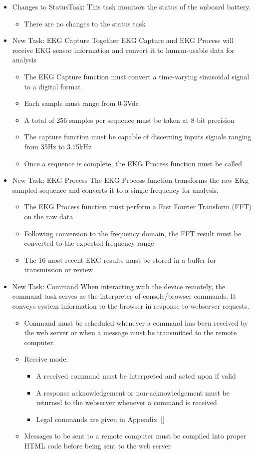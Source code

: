\documentclass[12pt]{article} %
\begin{document}
\begin{itemize}
  \item Changes to StatusTask:
		This task monitors the status of the onboard battery.
    \begin{itemize}
      \item There are no changes to the status task
    \end{itemize}
	\item New Task: EKG Capture
		Together EKG Capture and EKG Process will receive EKG sensor information
		and convert it to human-usable data for analysis
		\begin{itemize}
			\item The EKG Capture function must convert a time-varying sinusoidal signal to a digital format
			\item Each sample must range from 0-3Vdc
			\item A total of 256 samples per sequence must be taken at 8-bit precision
			\item The capture function must be capable of discerning inputs signals ranging from 35Hz to 3.75kHz
			\item Once a sequence is complete, the EKG Process function must be called
		\end{itemize}
	\item New Task: EKG Process
		The EKG Process function transforms the raw EKg sampled sequence and
		converts it to a single frequency for analysis.
		\begin{itemize}
			\item The EKG Process function must perform a Fast Fourier Transform (FFT) on the raw data
			\item Following conversion to the frequency domain, the FFT result must be converted to the expected frequency range
			\item The 16 most recent EKG results must be stored in a buffer for transmission or review
		\end{itemize}
	\item New Task: Command
		When interacting with the device remotely, the command task serves as the interpreter of console/browser commands. It conveys system information to the browser in response to webserver requests.
		\begin{itemize}
			\item Command must be scheduled whenever a command has been received by
				the web server or when a message must be transmitted to the remote
				computer.
			\item Receive mode:
				\begin{itemize}
					\item A received command must be interpreted and acted upon if valid
					\item A response acknowledgement or non-acknowledgement must be
						returned to the webserver whenever a command is received
					\item Legal commands are given in Appendix~\ref{}
				\end{itemize}
			\item Messages to be sent to a remote computer must be compiled into proper HTML code before being sent to the web server
		\end{itemize}


\end{itemize}
\end{document}
